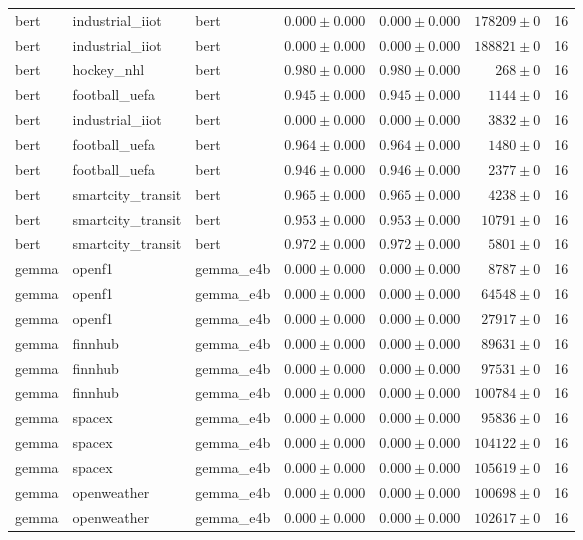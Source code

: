 \begin{table}[htbp]
\begin{tabular}{l l l r r r r}
bert & industrial\_iiot & bert & $0.000\pm0.000$ & $0.000\pm0.000$ & $178209\pm0$ & 16 \\
bert & industrial\_iiot & bert & $0.000\pm0.000$ & $0.000\pm0.000$ & $188821\pm0$ & 16 \\
bert & hockey\_nhl & bert & $0.980\pm0.000$ & $0.980\pm0.000$ & $268\pm0$ & 16 \\
bert & football\_uefa & bert & $0.945\pm0.000$ & $0.945\pm0.000$ & $1144\pm0$ & 16 \\
bert & industrial\_iiot & bert & $0.000\pm0.000$ & $0.000\pm0.000$ & $3832\pm0$ & 16 \\
bert & football\_uefa & bert & $0.964\pm0.000$ & $0.964\pm0.000$ & $1480\pm0$ & 16 \\
bert & football\_uefa & bert & $0.946\pm0.000$ & $0.946\pm0.000$ & $2377\pm0$ & 16 \\
bert & smartcity\_transit & bert & $0.965\pm0.000$ & $0.965\pm0.000$ & $4238\pm0$ & 16 \\
bert & smartcity\_transit & bert & $0.953\pm0.000$ & $0.953\pm0.000$ & $10791\pm0$ & 16 \\
bert & smartcity\_transit & bert & $0.972\pm0.000$ & $0.972\pm0.000$ & $5801\pm0$ & 16 \\
gemma & openf1 & gemma\_e4b & $0.000\pm0.000$ & $0.000\pm0.000$ & $8787\pm0$ & 16 \\
gemma & openf1 & gemma\_e4b & $0.000\pm0.000$ & $0.000\pm0.000$ & $64548\pm0$ & 16 \\
gemma & openf1 & gemma\_e4b & $0.000\pm0.000$ & $0.000\pm0.000$ & $27917\pm0$ & 16 \\
gemma & finnhub & gemma\_e4b & $0.000\pm0.000$ & $0.000\pm0.000$ & $89631\pm0$ & 16 \\
gemma & finnhub & gemma\_e4b & $0.000\pm0.000$ & $0.000\pm0.000$ & $97531\pm0$ & 16 \\
gemma & finnhub & gemma\_e4b & $0.000\pm0.000$ & $0.000\pm0.000$ & $100784\pm0$ & 16 \\
gemma & spacex & gemma\_e4b & $0.000\pm0.000$ & $0.000\pm0.000$ & $95836\pm0$ & 16 \\
gemma & spacex & gemma\_e4b & $0.000\pm0.000$ & $0.000\pm0.000$ & $104122\pm0$ & 16 \\
gemma & spacex & gemma\_e4b & $0.000\pm0.000$ & $0.000\pm0.000$ & $105619\pm0$ & 16 \\
gemma & openweather & gemma\_e4b & $0.000\pm0.000$ & $0.000\pm0.000$ & $100698\pm0$ & 16 \\
gemma & openweather & gemma\_e4b & $0.000\pm0.000$ & $0.000\pm0.000$ & $102617\pm0$ & 16 \\

\end{tabular}
\end{table}
